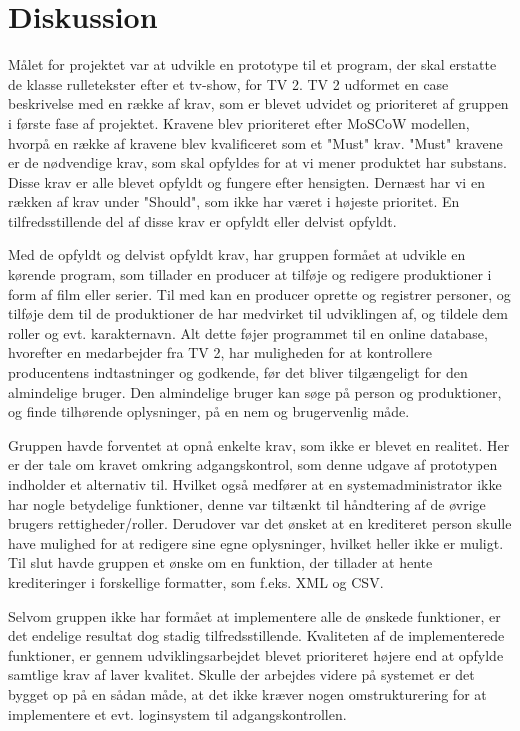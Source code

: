 \section{Diskussion}

Målet for projektet var at udvikle en prototype til et program, der skal
erstatte de klasse rulletekster efter et tv-show, for TV 2. TV 2 udformet en
case beskrivelse med en række af krav, som er blevet udvidet og prioriteret af
gruppen i første fase af projektet. Kravene blev prioriteret efter MoSCoW
modellen, hvorpå en række af kravene blev kvalificeret som et "Must" krav.
"Must" kravene er de nødvendige krav, som skal opfyldes for at vi mener
produktet har substans. Disse krav er alle blevet opfyldt og fungere efter
hensigten. Dernæst har vi en rækken af krav under "Should", som ikke har været i
højeste prioritet. En tilfredsstillende del af disse krav er opfyldt eller
delvist opfyldt.

Med de opfyldt og delvist opfyldt krav, har gruppen formået at udvikle en
kørende program, som tillader en producer at tilføje og redigere produktioner i
form af film eller serier. Til med kan en producer oprette og registrer
personer, og tilføje dem til de produktioner de har medvirket til udviklingen
af, og tildele dem roller og evt. karakternavn. Alt dette føjer programmet til
en online database, hvorefter en medarbejder fra TV 2, har muligheden for at
kontrollere producentens indtastninger og godkende, før det bliver tilgængeligt
for den almindelige bruger. Den almindelige bruger kan søge på person og
produktioner, og finde tilhørende oplysninger, på en nem og brugervenlig måde. 

Gruppen havde forventet at opnå enkelte krav, som ikke er blevet en realitet.
Her er der tale om kravet omkring adgangskontrol, som denne udgave af prototypen
indholder et alternativ til. Hvilket også medfører at en systemadministrator
ikke har nogle betydelige funktioner, denne var tiltænkt til håndtering af de
øvrige brugers rettigheder/roller. Derudover var det ønsket at en krediteret
person skulle have mulighed for at redigere sine egne oplysninger, hvilket
heller ikke er muligt. Til slut havde gruppen et ønske om en funktion, der
tillader at hente krediteringer i forskellige formatter, som f.eks. XML og CSV. 

Selvom gruppen ikke har formået at implementere alle de ønskede funktioner, er
det endelige resultat dog stadig tilfredsstillende. Kvaliteten af de
implementerede funktioner, er gennem udviklingsarbejdet blevet prioriteret
højere end at opfylde samtlige krav af laver kvalitet. Skulle der arbejdes
videre på systemet er det bygget op på en sådan måde, at det ikke kræver nogen
omstrukturering for at implementere et evt. loginsystem til adgangskontrollen.


